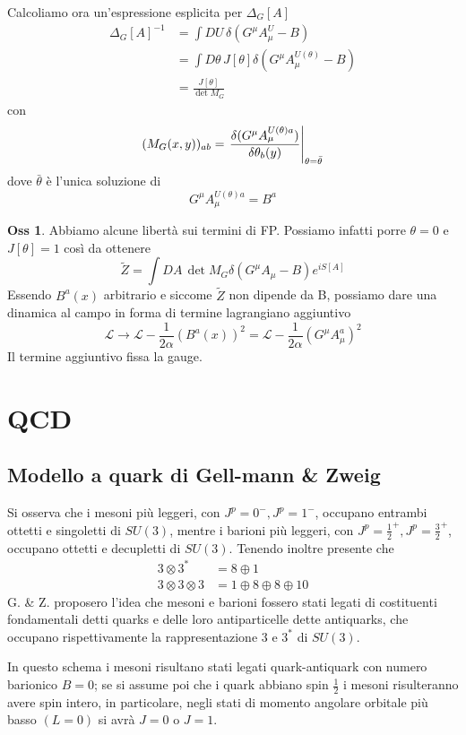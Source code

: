 \documentclass[10pt,a4paper]{article}
\theoremstyle{definition}
\newtheorem{observation}{Oss}[section]
\newcommand{\lagr}{\mathcal{L}} %
\begin{document}
Calcoliamo ora un'espressione esplicita per $\Delta_G[A]$
\begin{align*}
    \Delta_G[A]^{-1} &= \int DU\, \delta(G^\mu A_\mu^U - B) \\
    &= \int D\theta\, J[\theta] \delta(G^\mu A_\mu^{U(\theta)} - B) \\
    &= \frac{J[\theta]}{\det M_G}
\end{align*}
con 
\[
(M_G(x, y))_{ab} = \eval{\fdv{(G^\mu A_\mu^{U(\theta)a})}{\theta_b(y)}}_{\theta = \bar{\theta}}    
\]
dove $\bar{\theta}$ è l'unica soluzione di 
\[
    G^\mu A_\mu^{U(\theta)a} = B^a
\]
\begin{observation}
    Abbiamo alcune libertà sui termini di FP. Possiamo infatti porre $\theta = 0$ e $J[\theta] = 1$ così da ottenere
    \[
    \tilde{Z} = \int DA\, \det M_G \delta(G^\mu A_\mu - B)e^{iS[A]}   
    \]
    Essendo $B^a(x)$ arbitrario e siccome $\tilde{Z}$ non dipende da B, possiamo dare una dinamica al campo in forma di termine lagrangiano aggiuntivo
    \[
    \lagr \to \lagr - \frac{1}{2\alpha}(B^a(x))^2 = \lagr - \frac{1}{2\alpha}(G^\mu A_\mu^a)^2      
    \]
    Il termine aggiuntivo fissa la gauge.
\end{observation}


\section{QCD}
\subsection{Modello a quark di Gell-mann \& Zweig}
Si osserva che i mesoni più leggeri, con \(J^p = 0^-, J^p = 1^-\), occupano entrambi ottetti e singoletti di \(SU(3)\), mentre i barioni più leggeri, con \(J^p = \frac12^+, J^p=\frac32^+\), occupano ottetti e decupletti di \(SU(3)\).
Tenendo inoltre presente che 
\begin{align*}
    3 \otimes 3^* &= 8 \oplus 1 \\
    3 \otimes 3 \otimes 3 &= 1 \oplus 8 \oplus 8 \oplus 10
\end{align*}
G. \& Z. proposero l'idea che mesoni e barioni fossero stati legati di costituenti fondamentali detti quarks e delle loro antiparticelle dette antiquarks, che occupano rispettivamente la rappresentazione \(3\) e \(3^*\) di \(SU(3)\).

In questo schema i mesoni risultano stati legati quark-antiquark con numero barionico \(B = 0\); se si assume poi che i quark abbiano spin \(\frac12\) i mesoni risulteranno avere spin intero, in particolare, negli stati di momento angolare orbitale più basso \((L = 0)\) si avrà \(J = 0\) o \(J = 1\).
\end{document}
